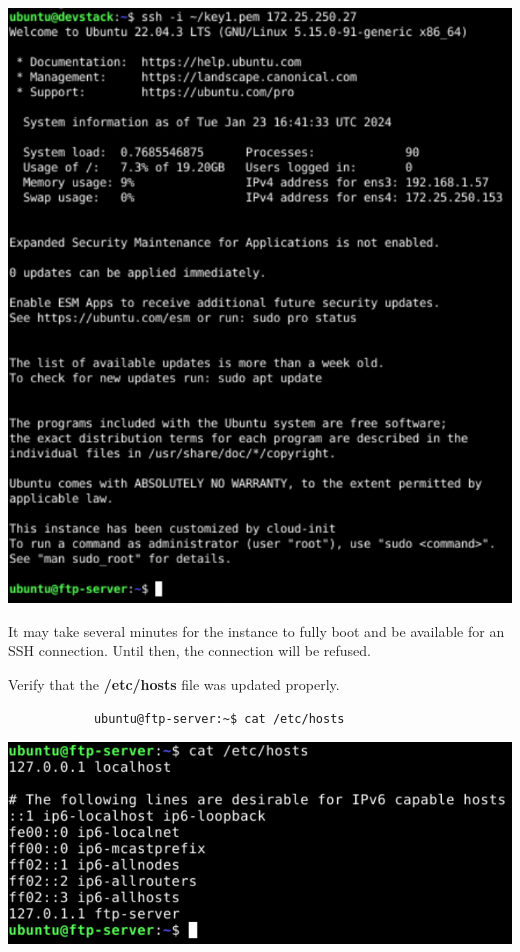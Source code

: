 \documentclass[letterpaper, 12pt]{article}
\begin{document}
\begin{enumerate}
\begin{labstep}
        \begin{center}
            \includegraphics[width=\linewidth]{images/part2/step7.png}
        \end{center}
    \end{labstep}

    \begin{notebox}
        It may take several minutes for the instance to fully boot and be available for an SSH connection.
        Until then, the connection will be refused.
    \end{notebox}

    \begin{labstep}
        Verify that the \textbf{/etc/hosts} file was updated properly.
        \begin{lstlisting}
            ubuntu@ftp-server:~$ cat /etc/hosts
        \end{lstlisting}

        \begin{center}
            \includegraphics[width=\linewidth]{images/part2/step8.png}
        \end{center}
    \end{labstep}


\end{enumerate}
\end{document}
